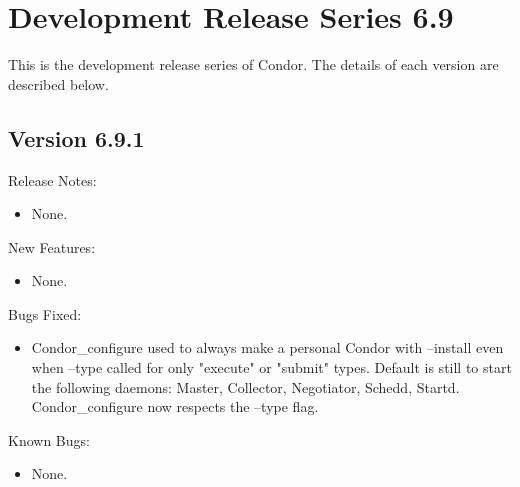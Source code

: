 \section{\label{sec:History-6-9}Development Release Series 6.9}

This is the development release series of Condor.
The details of each version are described below.

\subsection*{\label{sec:New-6-9-1}Version 6.9.1}

\noindent Release Notes:

\begin{itemize}

\item None.

\end{itemize}

\noindent New Features:

\begin{itemize}

\item None.

\end{itemize}

\noindent Bugs Fixed:

\begin{itemize}

\item Condor_configure used to always make a personal Condor with --install
even when --type called for only "execute" or "submit" types. Default is still
to start the following daemons: Master, Collector, Negotiator, Schedd, Startd.
Condor_configure now respects the --type flag.

\end{itemize}

\noindent Known Bugs:

\begin{itemize}

\item None.

\end{itemize}


